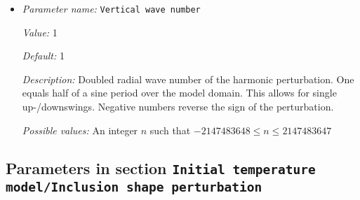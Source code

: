 \begin{itemize}
{\it Value:} 1600.0


{\it Default:} 1600.0


{\it Description:} The reference temperature that is perturbed by the harmonic function. Only used in incompressible models.


{\it Possible values:} A floating point number $v$ such that $0 \leq v \leq \text{MAX\_DOUBLE}$
\item {\it Parameter name:} {\tt Vertical wave number}
\label{parameters:Initial temperature model/Harmonic perturbation/Vertical wave number}


{\it Value:} 1


{\it Default:} 1


{\it Description:} Doubled radial wave number of the harmonic perturbation.  One equals half of a sine period over the model domain.  This allows for single up-/downswings. Negative numbers  reverse the sign of the perturbation.


{\it Possible values:} An integer $n$ such that $-2147483648\leq n \leq 2147483647$
\end{itemize}

\subsection{Parameters in section \tt Initial temperature model/Inclusion shape perturbation}
\label{parameters:Initial_20temperature_20model/Inclusion_20shape_20perturbation}

